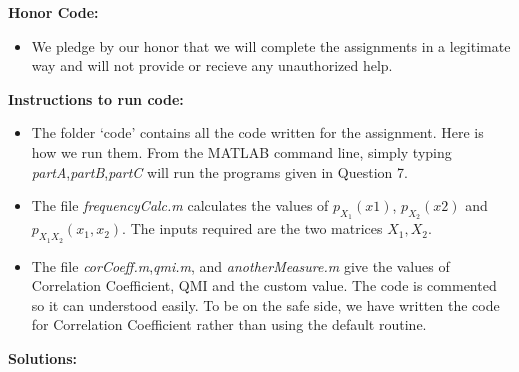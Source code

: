 \documentclass[11pt]{article}
\begin{document}
\maketitle
\newpage
{}

\textbf{Honor Code:} 
\begin{itemize}
\item We pledge by our honor that we will complete the assignments in a legitimate way and will not provide or recieve any unauthorized help. 
\end{itemize}
\vspace{5mm}
\textbf{Instructions to run code: }
\begin{itemize}
	\item{
		The folder `code' contains all the code written for the assignment. Here is how we run them. From the MATLAB command line, simply typing \textit{partA},\textit{partB},\textit{partC} will run the programs given in Question 7. 
	} 
	\item {
		The file \textit{frequencyCalc.m} calculates the values of $p_{X_1}(x1)$, $p_{X_2}(x2)$ and $p_{X_1X_2}(x_1,x_2)$. The inputs required are the two matrices $X_1,X_2$.
	}
	\item{
		The file \textit{corCoeff.m},\textit{qmi.m}, and \textit{anotherMeasure.m} give the values of Correlation Coefficient, QMI and the custom value. The code is commented so it can understood easily. 
		To be on the safe side, we have written the code for Correlation Coefficient rather than using the default routine.
	}
\end{itemize}
\textbf{Solutions: }
\end{document}
